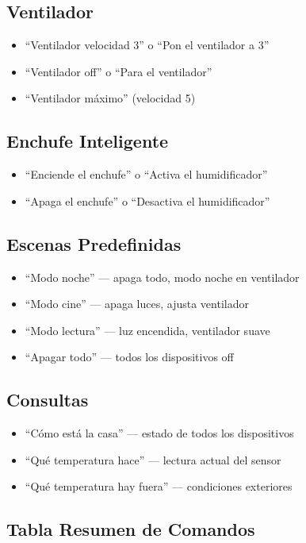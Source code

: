 \subsection{Ventilador}
\begin{itemize}
    \item ``Ventilador velocidad 3'' o ``Pon el ventilador a 3''
    \item ``Ventilador off'' o ``Para el ventilador''
    \item ``Ventilador máximo'' (velocidad 5)
\end{itemize}

\subsection{Enchufe Inteligente}
\begin{itemize}
    \item ``Enciende el enchufe'' o ``Activa el humidificador''
    \item ``Apaga el enchufe'' o ``Desactiva el humidificador''
\end{itemize}

\subsection{Escenas Predefinidas}
\begin{itemize}
    \item ``Modo noche'' --- apaga todo, modo noche en ventilador
    \item ``Modo cine'' --- apaga luces, ajusta ventilador
    \item ``Modo lectura'' --- luz encendida, ventilador suave
    \item ``Apagar todo'' --- todos los dispositivos off
\end{itemize}

\subsection{Consultas}
\begin{itemize}
    \item ``Cómo está la casa'' --- estado de todos los dispositivos
    \item ``Qué temperatura hace'' --- lectura actual del sensor
    \item ``Qué temperatura hay fuera'' --- condiciones exteriores
\end{itemize}

\subsection{Tabla Resumen de Comandos}

